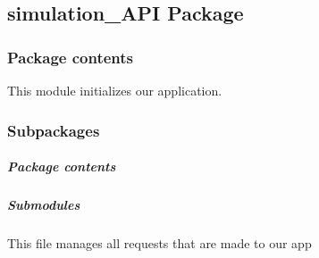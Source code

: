 \documentclass[a4paper,landscape,10pt,english]{sphinxmanual}
\begin{document}
\subsection{simulation\_API Package}
\label{\detokenize{code_docs/simulation_api:simulation-api-package}}\label{\detokenize{code_docs/simulation_api:code-api-package}}\label{\detokenize{code_docs/simulation_api::doc}}

\subsubsection{Package contents}
\label{\detokenize{code_docs/simulation_api:module-simulation_api}}\label{\detokenize{code_docs/simulation_api:package-contents}}
This module initializes our application.


\subsubsection{Subpackages}
\label{\detokenize{code_docs/simulation_api:subpackages}}

\paragraph{}
\label{\detokenize{code_docs/simulation_api.controller:simulation-api-controller}}\label{\detokenize{code_docs/simulation_api.controller::doc}}

\subparagraph{Package contents}
\label{\detokenize{code_docs/simulation_api.controller:module-simulation_api.controller}}\label{\detokenize{code_docs/simulation_api.controller:package-contents}}

\subparagraph{Submodules}
\label{\detokenize{code_docs/simulation_api.controller:submodules}}

\subparagraph{}
\label{\detokenize{code_docs/simulation_api.controller:module-simulation_api.controller.main}}\label{\detokenize{code_docs/simulation_api.controller:simulation-api-controller-main}}
This file manages all requests that are made to our app
\end{document}
